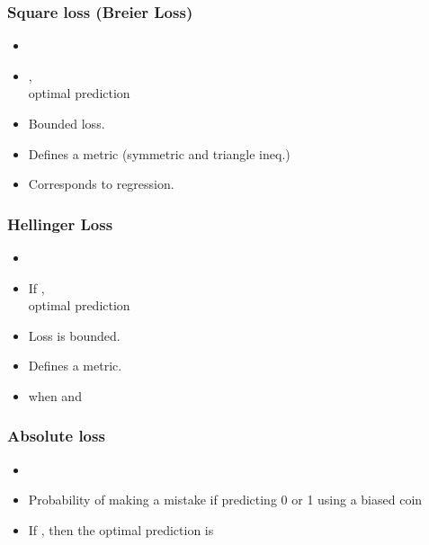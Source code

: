 \documentclass{beamer}
\begin{document}
\begin{frame}
\frametitle{Square loss (Breier Loss)}
\begin{itemize}
\item
\R{\[ \lambda_{\text{sq}}(\omega,\gamma)  = (\omega-\gamma)^2 \]}
\item
{}, \\
optimal prediction 
\item
Bounded loss.
\item
Defines a metric (symmetric and triangle ineq.)
\item
Corresponds to regression.
\end{itemize}
\end{frame}

\begin{frame}
\frametitle{Hellinger Loss}

\begin{itemize}
\item
\R{\[ \lambda_{\text{hel}}(\omega,\gamma)  = \frac{1}{2} \paren{
\paren{\sqrt{\omega} +\sqrt{\gamma}}^2 + 
\paren{\sqrt{1-\omega}+\sqrt{1-\gamma}}^2 
} \] } 
\item
If , \\
optimal prediction 
\item
Loss is bounded.
\item
Defines a metric.
\item 
{} when 
 and 
\end{itemize}
\end{frame}

\begin{frame}
\frametitle{Absolute loss}

\begin{itemize}
\item
\R{\[ \lambda(\omega,\gamma) = | \omega -\gamma | \]}
\item
Probability of making a mistake if predicting 0 or 1 
using a biased coin\\
\item
If , then the optimal prediction is 
\R{\[
\gamma^t = 
\begin{cases} 1 & \text{if $q>1/2$,} \\
              0 & \text{otherwise}
\end{cases}
\]}
\end{itemize}
\end{frame}
\end{document}

